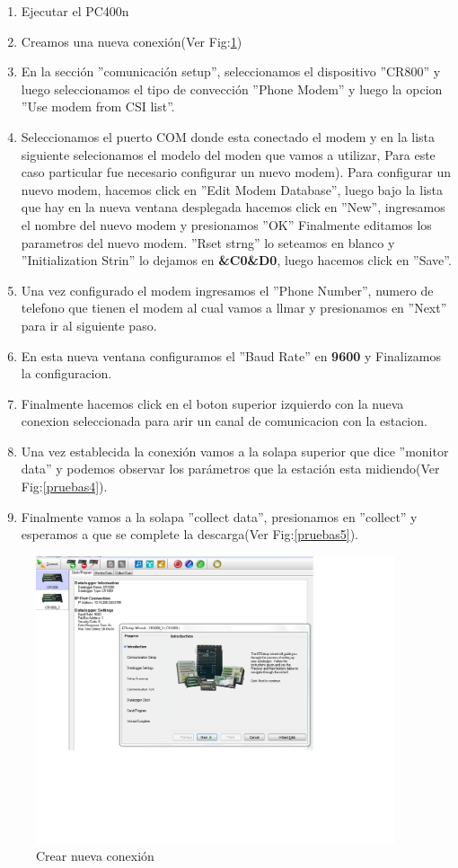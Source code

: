 \begin{enumerate}
\item Ejecutar el PC400n
\item Creamos una nueva conexión(Ver Fig:\ref{pruebas1})
\item En la sección ''comunicación setup'', seleccionamos el dispositivo ''CR800'' y luego seleccionamos el tipo de convección ''Phone Modem'' y luego la opcion ''Use modem from CSI list''.
\item Seleccionamos el puerto COM donde esta conectado el modem y en la lista siguiente selecionamos el modelo del moden que vamos a utilizar, Para este caso particular fue necesario configurar un nuevo modem).
\subitem Para configurar un nuevo modem, hacemos click en ''Edit Modem Database'', luego bajo la lista que hay en la nueva ventana desplegada hacemos click en ''New'', ingresamos el nombre del nuevo modem y presionamos ''OK''
\subitem Finalmente editamos los parametros del nuevo modem. ''Rset strng'' lo seteamos en blanco y ''Initialization Strin'' lo dejamos en \textbf{\&C0\&D0}, luego hacemos click en ''Save''. 
\item Una vez configurado el modem ingresamos el ''Phone Number'', numero de telefono que tienen el modem al cual vamos a llmar y presionamos en ''Next'' para ir al siguiente paso.
\item En esta nueva ventana configuramos el ''Baud Rate'' en \textbf{9600} y Finalizamos la configuracion.
\item Finalmente hacemos click en el boton superior izquierdo con la nueva conexion seleccionada para arir un canal de comunicacion con la estacion.
\item Una vez establecida la conexión vamos a la solapa superior que dice ''monitor data'' y podemos observar los parámetros que la estación esta midiendo(Ver Fig:\ref{pruebas4}).
\item Finalmente vamos a la solapa ''collect data'', presionamos en ''collect'' y esperamos a que se complete la descarga(Ver Fig:\ref{pruebas5}).
\end{enumerate}
\begin{figure}[h!]
        \centering
        \includegraphics[width=300pt]{images/pruebas1}
        \caption{Crear nueva conexión}
        \label{pruebas1}
\end{figure}
